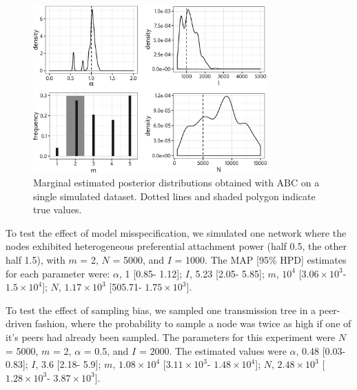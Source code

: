\documentclass[12pt]{article}\usepackage[]{graphicx}\usepackage[]{color}
\def\figwidth{0.8\textwidth}
\begin{document}
\begin{figure}[ht]
  \centering
  \includegraphics[width=\figwidth]{abc-posterior-example}
  \caption{Marginal estimated posterior distributions obtained with ABC on a
  single simulated dataset. Dotted lines and shaded polygon indicate true
  values.}
  \label{fig:abcex}
\end{figure}



To test the effect of model misspecification, we simulated one network where
the nodes exhibited heterogeneous preferential attachment power (half 0.5, the
other half 1.5), with $m$ = 2, $N$ = 5000, and $I$ = 1000. The \gls{MAP} [95\%
HPD] estimates for each parameter were: 
$\alpha$, 
  1 [0.85-
                           1.12];
$I$,
  5.23 [2.05-
                       5.85];
$m$,
  \ensuremath{10^{4}} [\ensuremath{3.06\times 10^{3}}-
                              \ensuremath{1.5\times 10^{4}}];
$N$,
  \ensuremath{1.17\times 10^{3}} [505.71-
                       \ensuremath{1.75\times 10^{3}}].



To test the effect of sampling bias, we sampled one transmission tree in a
peer-driven fashion, where the probability to sample a node was twice as high
if one of it's peers had already been sampled. The parameters for this
experiment were $N$ = 5000, $m$ = 2, $\alpha$ = 0.5, and $I$ = 2000. The
estimated values were
$\alpha$, 
  0.48 [0.03-
                           0.83];
$I$,
  3.6 [2.18-
                       5.9];
$m$,
  \ensuremath{1.08\times 10^{4}} [\ensuremath{3.11\times 10^{3}}-
                              \ensuremath{1.48\times 10^{4}}];
$N$,
  \ensuremath{2.48\times 10^{3}} [\ensuremath{1.28\times 10^{3}}-
                       \ensuremath{3.87\times 10^{3}}].
\end{document}
